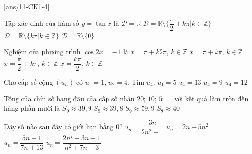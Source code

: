 \setcounter{deso}{3}
\begin{name}
	{\tenchude}
	{\tendethi}
	{\tentruong}
	{\thoigian}
\end{name}

\caulc
{}[ans/11-CK1-4]
\begin{ex}%
	Tập xác định của hàm số $y=\tan x$ là
	\choice
	{$\mathscr{D}=\mathbb{R}$}
	{\True $\mathscr{D}=\mathbb{R}\setminus \{\dfrac{\pi}{2}+k\pi |k\in \mathbb{Z}\}$}
	{$\mathscr{D}=\mathbb{R}\setminus \{k\pi |k\in \mathbb{Z}\}$}
	{$\mathscr{D}=\mathbb{R}\setminus \{0\}$}
\end{ex}

\begin{ex}%
	Nghiệm của phương trình $\cos 2x=-1$ là
	\choice
	{$x=\pi +k2\pi$, $k\in \mathbb{Z}$}
	{$x=\pi +k\pi$, $k\in \mathbb{Z}$}
	{\True $x=\dfrac{\pi}{2}+k\pi$, $k\in \mathbb{Z}$}
	{$x=\dfrac{k\pi}{2}$, $k\in \mathbb{Z}$}
\end{ex}

\begin{ex}%
	Cho cấp số cộng $\left(u_n\right)$ có $u_1=1$, $u_2=4$. Tìm $u_4$.
	\choice
	{$u_4=5$}
	{$u_4=13$}
	{\True $u_4=9$}
	{$u_4=12$}
\end{ex}

\begin{ex}%
	Tổng của chín số hạng đầu của cấp số nhân $20$; $10$; $5$; $\ldots$ với kết quả làm tròn đến hàng phần mười là
	\choice
	{\True $S_9\approx 39{,}9$}
	{$S_9\approx 39{,}8$}
	{$S_9\approx 59{,}9$}
	{$S_9\approx 40$}
\end{ex}

\begin{ex}%
	Dãy số nào sau đây có giới hạn bằng $0$?
	\choice
	{\True $u_n=\dfrac{3n}{2n^2+1}$}
	{$u_n=2n-5n^2$}
	{$u_n=\dfrac{5n+1}{7n+13}$}
	{$u_n=\dfrac{2n^2+3n-1}{n^2+7n-3}$}
\end{ex}


